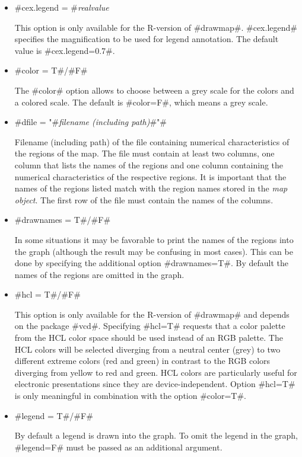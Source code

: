 \begin{itemize}
\item #cex.legend = #{\em realvalue}

This option is only available for the R-version of #drawmap#.
#cex.legend# specifies the  magnification to be used for legend
annotation. The default value is #cex.legend=0.7#.

\item #color = T#/#F#

The #color# option allows to choose between a grey scale for the
colors and a colored scale. The default is #color=F#, which means a
grey scale.

\item #dfile = "#{\em filename (including path)}#"#

Filename (including path) of the file containing numerical
characteristics of the regions of the map. The file must contain at
least two columns, one column that lists the names of the regions
and one column containing the numerical characteristics of the
respective regions. It is important that the names of the regions
listed match with the region names stored in the {\em map object}.
The first row of the file must contain the names of the columns.

\item #drawnames = T#/#F#

In some situations it may be favorable to print the names of the
regions into the graph (although the result may be confusing in most
cases). This can be done by specifying the additional option
#drawnames=T#. By default the names of the regions are omitted in
the graph.

\item #hcl = T#/#F#

This option is only available for the R-version of #drawmap# and
depends on the package #vcd#. Specifying #hcl=T# requests that a
color palette from the HCL color space should be used instead of an
RGB palette. The HCL colors will be selected diverging from a
neutral center (grey) to two different extreme colors (red and
green) in contrast to the RGB colors diverging from yellow to red
and green. HCL colors are particularly useful for electronic
presentations since they are device-independent. Option #hcl=T# is
only meaningful in combination with the option #color=T#.

\item #legend = T#/#F#

By default a legend is drawn into the graph. To omit the legend in
the graph, #legend=F# must be passed as an additional argument.


\end{itemize}
